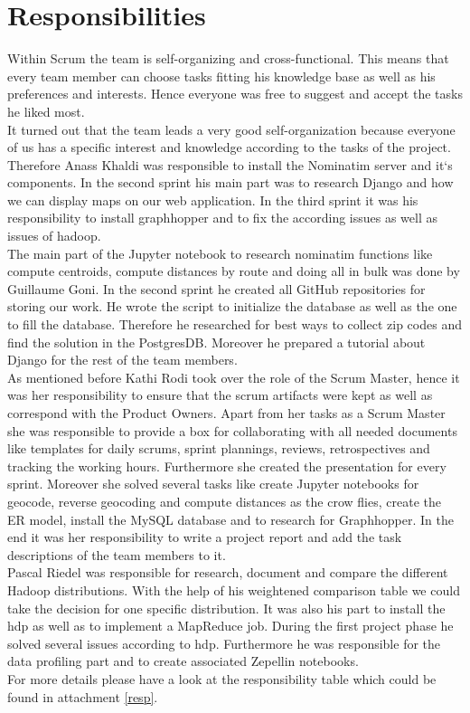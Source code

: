 \documentclass[12pt]{article}
\begin{document}
\section{Responsibilities}
Within Scrum the team is self-organizing and cross-functional. This means that every team member can choose tasks fitting his knowledge base as well as his preferences and interests. Hence everyone was free to suggest and accept the tasks he liked most.\\It turned out that the team leads a very good self-organization because everyone of us has a specific interest and knowledge according to the tasks of the project.\\Therefore Anass Khaldi was responsible to install the Nominatim server and it`s components. In the second sprint his main part was to research Django and how we can display maps on our web application. In the third sprint it was his responsibility to install graphhopper and to fix the according issues as well as issues of hadoop.\\
The main part of the Jupyter notebook to research nominatim functions like compute centroids, compute distances by route and doing all in bulk was done by Guillaume Goni. In the second sprint he created all GitHub repositories for storing our work. He wrote the script to initialize the database as well as the one to fill the database. Therefore he researched for best ways to collect zip codes and find the solution in the PostgresDB. Moreover he prepared a tutorial about Django for the rest of the team members. \\As mentioned before Kathi Rodi took over the role of the Scrum Master, hence it was her responsibility to ensure that the scrum artifacts were kept as well as correspond with the Product Owners. Apart from her tasks as a Scrum Master she was responsible to provide a box for collaborating with all needed documents like templates for daily scrums, sprint plannings, reviews, retrospectives and tracking the working hours. Furthermore she created the presentation for every sprint. Moreover she solved several tasks like create Jupyter notebooks for geocode, reverse geocoding and compute distances as the crow flies, create the ER model, install the MySQL database and to research for Graphhopper. In the end it was her responsibility to write a project report and add the task descriptions of the team members to it.\\Pascal Riedel was responsible for research, document and compare the different Hadoop distributions. With the help of his weightened comparison table we could take the decision for one specific distribution. It was also his part to install the \acs{hdp} as well as to implement a MapReduce job. During the first project phase he solved several issues according to \acs{hdp}. Furthermore he was responsible for the data profiling part and to create associated Zepellin notebooks.\\ For more details please have a look at the responsibility table which could be found in attachment \ref{resp}.
\end{document}
